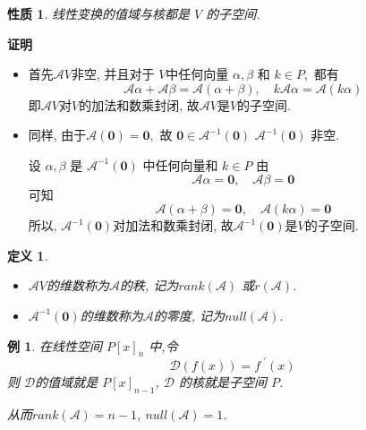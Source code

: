 \documentclass[13pt]{beamer}
\newtheorem{exa}{例}
\newtheorem*{defi}{定义}
\newtheorem*{prop}{性质}
\def\pf{{\bf 证明~~ }}
\def\A{\mathscr{A}}
\def\0{\mathbf{0}}
\begin{document}
\begin{frame}
\begin{prop}
线性变换的值域与核都是 $V$ 的子空间.
\end{prop}
\pf 
\begin{itemize}
\item 
首先$\A V$非空, 并且对于 $V$中任何向量 $\alpha, \beta$ 和 ${k} \in {P},$ 都有
\[
\A \alpha+ \A \beta= \A(\alpha+\beta), \quad k \A \alpha=\A(k \alpha)
\]
即$\A V$对$V$的加法和数乘封闭, 故$\A V$是$V$的子空间. 

\item 同样, 由于$\A(\0) =\0,$ 故 $\0 \in {\A}^{-1}(\0)$ ${\A}^{-1}(\mathbf{0})$ 非空.

设 $\alpha, \beta$ 是 $\A^{-1}(\0)$ 中任何向量和 ${k} \in {P}$
由
\[
\A \alpha=\0, \quad \A \beta=\0
\]
可知
\[
\A (\alpha+\beta)=\0, \quad \A(k \alpha)=\0
\]
所以, $\A^{-1}(\0)$对加法和数乘封闭,  故$\A^{-1}(\0)$是$V$的子空间. 
\end{itemize}
\end{frame}

\begin{frame}
\begin{defi}
\begin{itemize}
\item $\A V$的维数称为$\A$的\alert{秩}, 记为$rank (\A)$ 或$r(\A)$. 

\item $\A^{-1}(\0)$的维数称为$\A$的\alert{零度}, 记为$null (\A)$.
\end{itemize}

\end{defi}

\begin{exa}
在线性空间 $P[x]_{n}$ 中,令
\[
\mathscr{D}(f(x))=f^{\,\, \prime}(x)
\]
则 $\mathscr{D}$的值域就是 $P[ x]_{n-1}$, $\mathscr{D}$ 的核就是子空间 $P$.

从而$rank (\A) =n-1$, $null (\A) = 1$.
\end{exa}
\end{frame}
\end{document}
